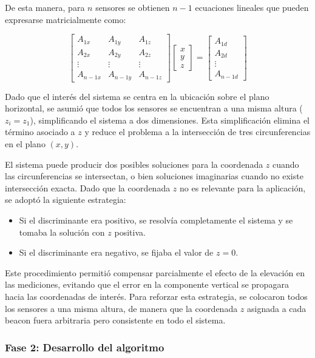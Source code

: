 De esta manera, para $n$ sensores se obtienen $n-1$ ecuaciones lineales que pueden expresarse matricialmente como:


\[
\begin{bmatrix}
A_{1x} & A_{1y} & A_{1z}\\
A_{2x} & A_{2y} & A_{2z} \\
\vdots & \vdots & \vdots \\
A_{n-1x} & A_{n-1y} & A_{n-1z}
\end{bmatrix}
\begin{bmatrix}
x \\ y \\ z
\end{bmatrix}
=
\begin{bmatrix}
A_{1d} \\ A_{2d} \\ \vdots \\ A_{n-1d}
\end{bmatrix}
\]


Dado que el interés del sistema se centra en la ubicación sobre el plano horizontal, se asumió que todos los sensores se encuentran a una misma altura ($z_i = z_1$), simplificando el sistema a dos dimensiones. Esta simplificación elimina el término asociado a $z$ y reduce el problema a la intersección de tres circunferencias en el plano $(x, y)$.

El sistema puede producir dos posibles soluciones para la coordenada $z$ cuando las circunferencias se intersectan, o bien soluciones imaginarias cuando no existe intersección exacta. Dado que la coordenada $z$ no es relevante para la aplicación, se adoptó la siguiente estrategia:
\begin{itemize}
  \item Si el discriminante era positivo, se resolvía completamente el sistema y se tomaba la solución con $z$ positiva.
  \item Si el discriminante era negativo, se fijaba el valor de $z = 0$.
\end{itemize}

Este procedimiento permitió compensar parcialmente el efecto de la elevación en las mediciones, evitando que el error en la componente vertical se propagara hacia las coordenadas de interés. Para reforzar esta estrategia, se colocaron todos los sensores a una misma altura, de manera que la coordenada $z$ asignada a cada beacon fuera arbitraria pero consistente en todo el sistema.

\subsubsection{Fase 2: Desarrollo del algoritmo}
